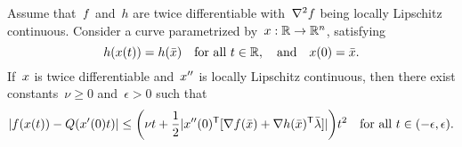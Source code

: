 \begin{theorem}
    \label{thm:sqp-path}
    Assume that~$f$ and~$h$ are twice differentiable with~$\nabla^2 f$ being locally Lipschitz continuous.
    Consider a curve parametrized by~$\iter : \R \to \R^n$, satisfying
    \begin{equation}
        \label{eq:sqp-path}
        h(\iter(t)) = h(\bar{\iter}) \quad \text{for all~$t \in \R$}, \quad \text{and} \quad \iter(0) = \bar{\iter}.
    \end{equation}
    If~$\iter$ is twice differentiable and~$\iter''$ is locally Lipschitz continuous, then there exist constants~$\nu \ge 0$ and~$\epsilon > 0$ such that
    \begin{equation*}
        \abs{\obj(\iter(t)) - Q(x'(0) t)} \le \bigg( \nu t + \frac{1}{2}\abs{\iter''(0)^{\T} [\nabla \obj(\bar{\iter}) + \nabla h(\bar{\iter})^{\T} \bar{\lm}]} \bigg) t^2 \quad \text{for all~$t \in (-\epsilon, \epsilon)$.}
    \end{equation*}
\end{theorem}

